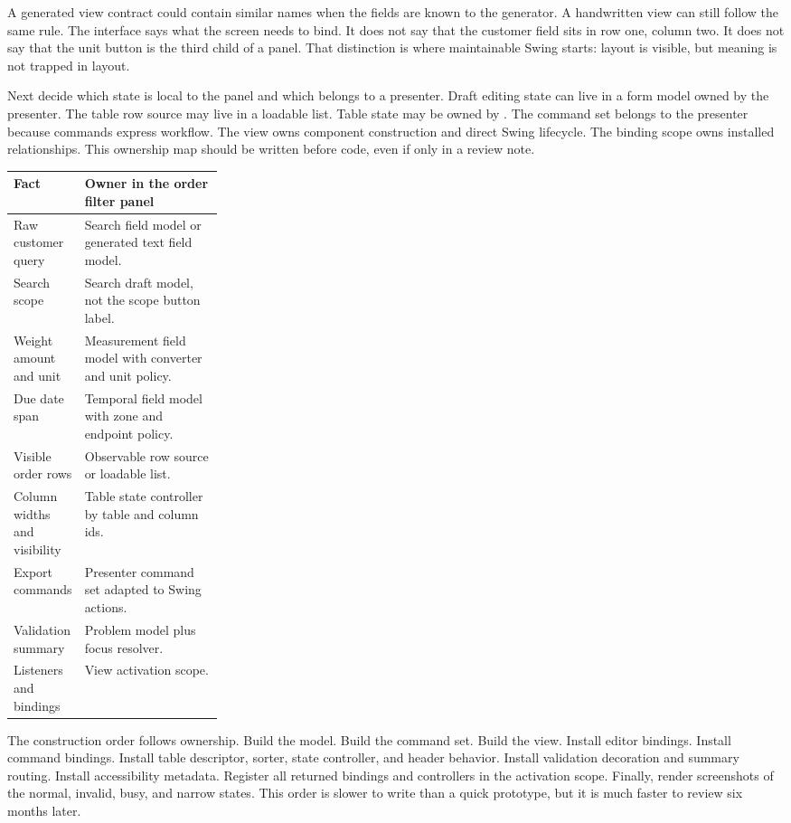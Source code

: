 A generated view contract could contain similar names when the fields are
known to the generator. A handwritten view can still follow the same rule.
The interface says what the screen needs to bind. It does not say that the
customer field sits in row one, column two. It does not say that the unit
button is the third child of a panel. That distinction is where maintainable
Swing starts: layout is visible, but meaning is not trapped in layout.

Next decide which state is local to the panel and which belongs to a presenter.
Draft editing state can live in a form model owned by the presenter. The table
row source may live in a loadable list. Table state may be owned by
. The command set belongs to the presenter because
commands express workflow. The view owns component construction and direct
Swing lifecycle. The binding scope owns installed relationships. This
ownership map should be written before code, even if only in a review note.

\begin{tabularx}{0.96\linewidth}{@{}p{0.27\linewidth}X@{}}
\toprule
Fact & Owner in the order filter panel\\
\midrule
Raw customer query & Search field model or generated text field model.\\
Search scope & Search draft model, not the scope button label.\\
Weight amount and unit & Measurement field model with converter and unit policy.\\
Due date span & Temporal field model with zone and endpoint policy.\\
Visible order rows & Observable row source or loadable list.\\
Column widths and visibility & Table state controller by table and column ids.\\
Export commands & Presenter command set adapted to Swing actions.\\
Validation summary & Problem model plus focus resolver.\\
Listeners and bindings & View activation scope.\\
\bottomrule
\end{tabularx}

The construction order follows ownership. Build the model. Build the command
set. Build the view. Install editor bindings. Install command bindings.
Install table descriptor, sorter, state controller, and header behavior.
Install validation decoration and summary routing. Install accessibility
metadata. Register all returned bindings and controllers in the activation
scope. Finally, render screenshots of the normal, invalid, busy, and narrow
states. This order is slower to write than a quick prototype, but it is much
faster to review six months later.


